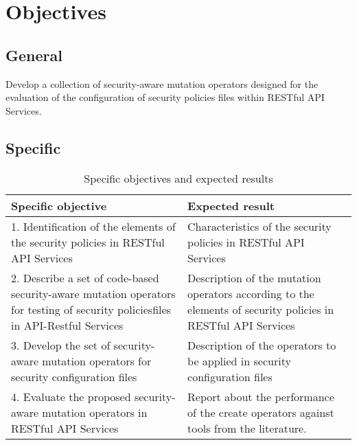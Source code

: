 \section{Objectives}

\subsection{General}

Develop a collection of security-aware mutation operators designed for the evaluation of the configuration of security policies files within RESTful API Services.
\subsection{Specific}

\begin{table}[H]
    \centering
    \begin{tabular}{|p{}|p{}|}
        \hline
         \textbf{Specific objective} & \textbf{Expected result} \\ \hline
         1.  Identification of the elements of the security policies in RESTful API Services &  Characteristics of the security policies in RESTful API Services  \\  \hline
         2. Describe a set of code-based security-aware mutation operators for testing of security policiesfiles in API-Restful Services & Description of the mutation operators according to the elements of security policies in RESTful API Services  \\  \hline
         3. Develop the set of security-aware mutation operators for security configuration files  & Description of the operators to be applied in security configuration files \\  \hline
         4. Evaluate the proposed security-aware mutation operators in RESTful API Services & Report about the performance of the create operators against tools from the literature.
         \\ \hline
    \end{tabular}
    \caption{Specific objectives and expected results}
    \label{tab:objetivos}
\end{table}
